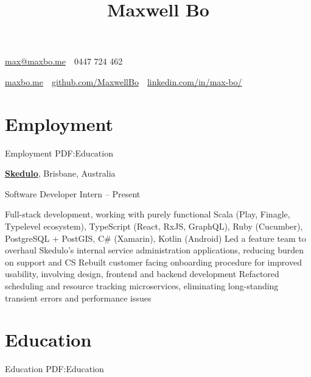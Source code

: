 \documentclass[a4paper,10pt,oneside]{article}
\begin{document}

\title{Maxwell Bo}

\begin{subtitle}
\par \href{mailto:max@maxbo.me}{max@maxbo.me} \,\BulletSymbol\, 0447 724 462

\par \href{http://maxbo.me/}{maxbo.me} 
\,\BulletSymbol\, 
\href{https://github.com/MaxwellBo}{github.com/MaxwellBo}
\,\BulletSymbol\, 
\href{https://www.linkedin.com/in/max-bo/}{linkedin.com/in/max-bo/}

\end{subtitle}

\begin{body}


\section
{Employment}
{Employment}
{PDF:Education}

\href{https://skedulo.com/}{\textbf{Skedulo}}, Brisbane, Australia
\par Software Developer Intern\hfill {} -- Present 
\begin{detail}
	\BulletItem Full-stack development, working with purely functional Scala (Play, Finagle, Typelevel ecosystem),\newline
	TypeScript (React, RxJS, GraphQL), Ruby (Cucumber), PostgreSQL + PostGIS, C\# (Xamarin), Kotlin (Android)
	\BulletItem Led a feature team to overhaul Skedulo's internal service administration applications, reducing burden on support and CS
	\BulletItem Rebuilt customer facing onboarding procedure for improved usability, involving design, frontend and backend development
	\BulletItem Refactored scheduling and resource tracking microservices, eliminating long-standing transient errors and performance issues
\end{detail}


\section
{Education}
{Education}
{PDF:Education}


\end{body}
\end{document}
